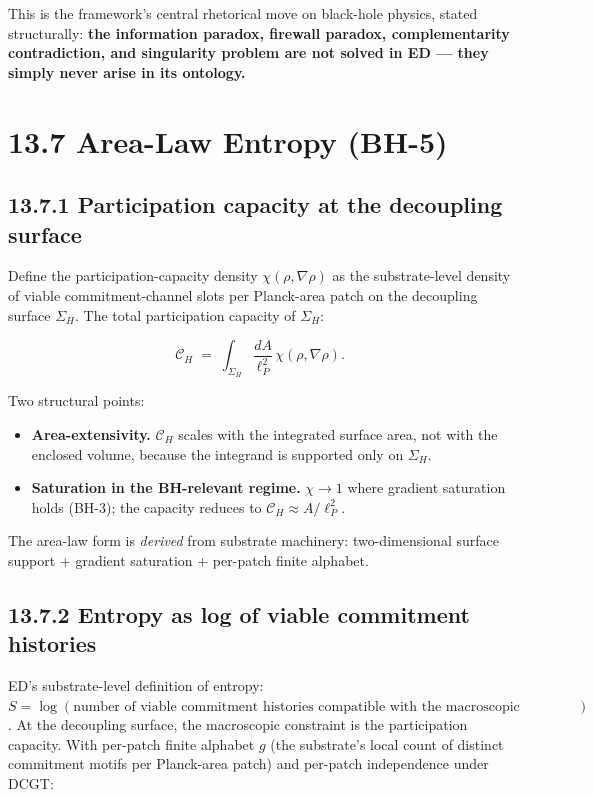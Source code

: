 \documentclass[11pt]{book}
\begin{document}
This is the framework's central rhetorical move on black-hole physics, stated structurally: \textbf{the information paradox, firewall paradox, complementarity contradiction, and singularity problem are not solved in ED — they simply never arise in its ontology.}

\section{13.7 Area-Law Entropy (BH-5)}

\subsection{13.7.1 Participation capacity at the decoupling surface}

Define the participation-capacity density $\chi(\rho, \nabla\rho)$ as the substrate-level density of viable commitment-channel slots per Planck-area patch on the decoupling surface $\Sigma_H$. The total participation capacity of $\Sigma_H$:

\[
\mathcal{C}_H \;=\; \int_{\Sigma_H} \frac{dA}{\ell_P^2}\,\chi(\rho, \nabla\rho).
\]

Two structural points:
\begin{itemize}
\item \textbf{Area-extensivity.} $\mathcal{C}_H$ scales with the integrated surface area, not with the enclosed volume, because the integrand is supported only on $\Sigma_H$.
\item \textbf{Saturation in the BH-relevant regime.} $\chi \to 1$ where gradient saturation holds (BH-3); the capacity reduces to $\mathcal{C}_H \approx A/\ell_P^2$.
\end{itemize}

The area-law form is \textit{derived} from substrate machinery: two-dimensional surface support + gradient saturation + per-patch finite alphabet.

\subsection{13.7.2 Entropy as log of viable commitment histories}

ED's substrate-level definition of entropy: $S = \log(\text{number of viable commitment histories compatible with the macroscopic constraint})$. At the decoupling surface, the macroscopic constraint is the participation capacity. With per-patch finite alphabet $g$ (the substrate's local count of distinct commitment motifs per Planck-area patch) and per-patch independence under DCGT:
\end{document}
